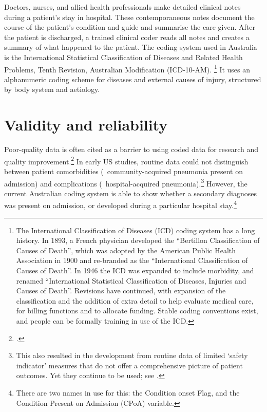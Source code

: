 \documentclass[FrontPage]{grattan}
\begin{document}
Doctors, nurses, and allied health professionals make detailed clinical notes during a patient’s stay in hospital. These contemporaneous notes document the course of the patient’s condition and guide and summarise the care given. After the patient is discharged, a trained clinical coder reads all notes and creates a summary of what happened to the patient. The coding system used in Australia is the International Statistical Classification of Diseases and Related Health Problems, Tenth Revision, Australian Modification (ICD-10-AM).%
    \footnote{The International Classification of Diseases (ICD) coding system has a long history. In 1893, a French physician developed the ``Bertillon Classification of Causes of Death'', which was adopted by the American Public Health Association in 1900 and re-branded as the “International Classification of Causes of Death”. In 1946 the ICD was expanded to include morbidity, and renamed “International Statistical Classification of Diseases, Injuries and Causes of Death”. Revisions have continued, with expansion of the classification and the addition of extra detail to help evaluate medical care, for billing functions and to allocate funding. Stable coding conventions exist, and people can be formally training in use of the ICD.} It uses an alphanumeric coding scheme for diseases and external causes of injury, structured by body system and aetiology.

\section{Validity and reliability}
Poor-quality data is often cited as a barrier to using coded data for research and quality improvement.\footcite{scott2006public}
In early US studies, routine data could not distinguish between patient comorbidities (\eg~community-acquired pneumonia present on admission) and complications (\eg~hospital-acquired pneumonia).\footnote{This also resulted in the development from routine data of limited ‘safety indicator’ measures that do not offer a comprehensive picture of patient outcomes. Yet they continue to be used; see \textcite{RN102}.}
However, the current Australian coding system is able to show whether a secondary diagnoses was present on admission, or developed during a particular hospital stay.\footnote{There are two names in use for this: the Condition onset Flag, and the Condition Present on Admission (CPoA) variable.}
\end{document}

